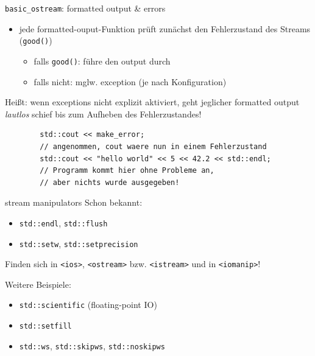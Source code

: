 \begin{frame}[fragile]{\texttt{basic\_ostream}: formatted output \& errors}
	\begin{itemize}
		\item jede formatted-ouput-Funktion prüft zunächst den Fehlerzustand des Streams (\texttt{good()})
		\begin{itemize}
			\item falls \texttt{good()}: führe den output durch
			\item falls nicht: mglw. exception (je nach Konfiguration)
		\end{itemize}
	\end{itemize}
	
	\pause
	\vspace{2em}
	
	Heißt: wenn exceptions nicht explizit aktiviert, geht jeglicher formatted output \emph{lautlos} schief bis zum Aufheben des Fehlerzustandes!
	
	\begin{lstlisting}
		std::cout << make_error;
		// angenommen, cout waere nun in einem Fehlerzustand
		std::cout << "hello world" << 5 << 42.2 << std::endl;
		// Programm kommt hier ohne Probleme an,
		// aber nichts wurde ausgegeben!
	\end{lstlisting}
\end{frame}

\begin{frame}{stream manipulators}
	Schon bekannt:
	\begin{itemize}
		\item \texttt{std::endl}, \texttt{std::flush}
		\item \texttt{std::setw}, \texttt{std::setprecision}
	\end{itemize}
	
	\vspace{1em}
	
	Finden sich in \texttt{<ios>}, \texttt{<ostream>} bzw. \texttt{<istream>} und in \texttt{<iomanip>}!
	
	\vspace{1em}
	
	Weitere Beispiele:
	\begin{itemize}
		\item \texttt{std::scientific} (floating-point IO)
		\item \texttt{std::setfill}
		\item \texttt{std::ws}, \texttt{std::skipws}, \texttt{std::noskipws}
	\end{itemize}
\end{frame}

